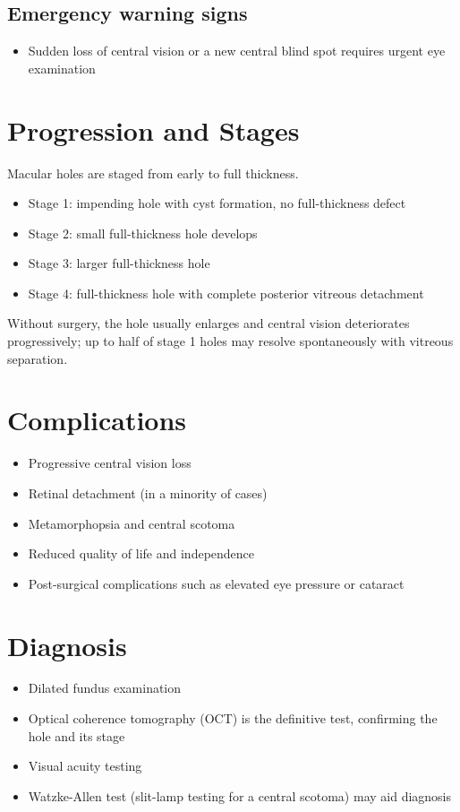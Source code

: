 \subsection{Emergency warning signs}
\begin{itemize}[noitemsep]
  \item Sudden loss of central vision or a new central blind spot requires urgent eye examination
\end{itemize}
\section{Progression and Stages}
Macular holes are staged from early to full thickness.
\begin{itemize}[noitemsep]
  \item Stage 1: impending hole with cyst formation, no full-thickness defect
  \item Stage 2: small full-thickness hole develops
  \item Stage 3: larger full-thickness hole
  \item Stage 4: full-thickness hole with complete posterior vitreous detachment
\end{itemize}
Without surgery, the hole usually enlarges and central vision deteriorates progressively; up to half of stage 1 holes may resolve spontaneously with vitreous separation.
\section{Complications}
\begin{itemize}[noitemsep]
  \item Progressive central vision loss
  \item Retinal detachment (in a minority of cases)
  \item Metamorphopsia and central scotoma
  \item Reduced quality of life and independence
  \item Post-surgical complications such as elevated eye pressure or cataract
\end{itemize}
\section{Diagnosis}
\begin{itemize}[noitemsep]
  \item Dilated fundus examination
  \item Optical coherence tomography (OCT) is the definitive test, confirming the hole and its stage
  \item Visual acuity testing
  \item Watzke-Allen test (slit-lamp testing for a central scotoma) may aid diagnosis
\end{itemize}
